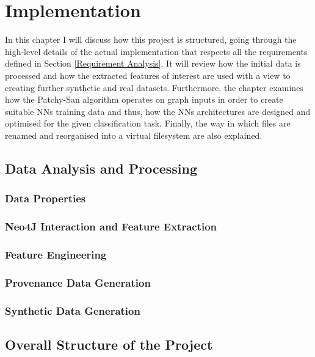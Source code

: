 

\chapter{Implementation}

In this chapter I will discuss how this project is structured, going through the high-level details of the actual implementation that respects all the requirements defined in Section \ref{Requirement Analysis}. It will review how the initial data is processed and how the extracted features of interest are used with a view to creating further synthetic and real datasets. Furthermore, the chapter examines how the Patchy-San algorithm operates on graph inputs in order to create suitable NNs training data and thus, how the NNs architectures are designed and optimised for the given classification task. Finally, the way in which files are renamed and reorganised into a virtual filesystem are also explained. \\


\section{Data Analysis and Processing}

\subsection{Data Properties}

\subsection{Neo4J Interaction and Feature Extraction}

\subsection{Feature Engineering}

\subsection{Provenance Data Generation}

\subsection{Synthetic Data Generation} \label{synthetic data generation}


\section{Overall Structure of the Project}

